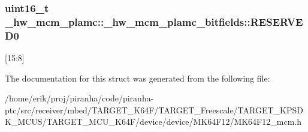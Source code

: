 \subsubsection[{\texorpdfstring{R\+E\+S\+E\+R\+V\+E\+D0}{RESERVED0}}]{\setlength{\rightskip}{0pt plus 5cm}uint16\+\_\+t \+\_\+hw\+\_\+mcm\+\_\+plamc\+::\+\_\+hw\+\_\+mcm\+\_\+plamc\+\_\+bitfields\+::\+R\+E\+S\+E\+R\+V\+E\+D0}\hypertarget{struct__hw__mcm__plamc_1_1__hw__mcm__plamc__bitfields_a66975faeb54ccf2ebfafcbb9023edda8}{}\label{struct__hw__mcm__plamc_1_1__hw__mcm__plamc__bitfields_a66975faeb54ccf2ebfafcbb9023edda8}
\mbox{[}15\+:8\mbox{]} 

The documentation for this struct was generated from the following file\+:\begin{DoxyCompactItemize}
\item 
/home/erik/proj/piranha/code/piranha-\/ptc/src/receiver/mbed/\+T\+A\+R\+G\+E\+T\+\_\+\+K64\+F/\+T\+A\+R\+G\+E\+T\+\_\+\+Freescale/\+T\+A\+R\+G\+E\+T\+\_\+\+K\+P\+S\+D\+K\+\_\+\+M\+C\+U\+S/\+T\+A\+R\+G\+E\+T\+\_\+\+M\+C\+U\+\_\+\+K64\+F/device/device/\+M\+K64\+F12/M\+K64\+F12\+\_\+mcm.\+h\end{DoxyCompactItemize}
